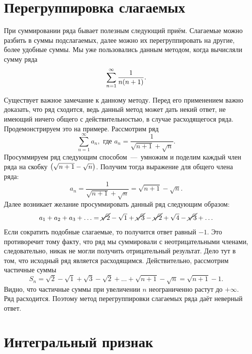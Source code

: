 \documentclass[12pt]{article}
\begin{document}
\section{Перегруппировка слагаемых}
При суммировании ряда бывает полезным следующий приём. Слагаемые можно разбить в суммы подслагаемых, далее можно их перегруппировать на другие, более удобные суммы. Мы уже пользовались данным методом, когда вычисляли сумму ряда 
\begin{equation}
    \sum_{n=1}^\infty \dfrac{1}{n\qty(n+1)}.
\end{equation}
\par
Существует важное замечание к данному методу. Перед его применением важно доказать, что ряд сходится, ведь данный метод может дать некий ответ, не имеющий ничего общего с действительностью, в случае расходящегося ряда. Продемонстрируем это на примере. Рассмотрим ряд
\begin{equation}
    \sum_{n=1}^\infty a_n, \text{ где } a_n = \dfrac{1}{\sqrt{n+1} + \sqrt{n}}.
\end{equation}
Просуммируем ряд следующим способом~\----~умножим и поделим каждый член ряда на скобку $\qty(\sqrt{n+1} - \sqrt{n})$. Получим тогда выражение для общего члена ряда:
\begin{equation}
    a_n = \dfrac{1}{\sqrt{n+1} + \sqrt{n}} = \sqrt{n+1} - \sqrt{n}.
\end{equation}
Далее возникает желание просуммировать данный ряд следующим образом:
\begin{equation}
    a_1+a_2+a_3+\ldots = \cancel{\sqrt{2}} - \sqrt{1} + \cancel{\sqrt{3}} - \cancel{\sqrt{2}} +\sqrt{4} - \cancel{\sqrt{3}} + \ldots
\end{equation}
Если сократить подобные слагаемые, то получится ответ равный $-1$. Это противоречит тому факту, что ряд мы суммировали с неотрицательными членами, следовательно, никак не могли получить отрицательный результат. Дело тут в том, что исходный ряд является расходящимся. Действительно, рассмотрим частичные суммы
\begin{equation}
    S_n = \sqrt{2} - \sqrt{1} + \sqrt{3} - \sqrt{2} + \ldots + \sqrt{n+1} - \sqrt{n} = \sqrt{n+1} -1.
\end{equation}
Видно, что частичные суммы при увеличении $n$ неограниченно растут до $+\infty$. Ряд расходится. Поэтому метод перегруппировки слагаемых ряда даёт неверный ответ.
\section{Интегральный признак}
\end{document}

